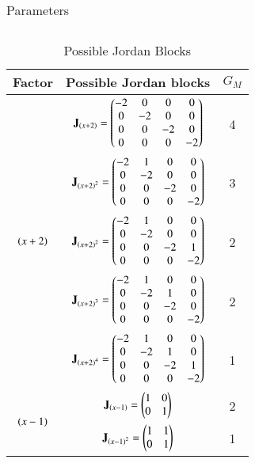 \documentclass[journal,12pt,twocolumn]{IEEEtran}
\numberwithin{table}{section}
\begin{document}
\begin{table*}[ht!]
\begin{center}
\begin{tabular}{|p{5cm}|p{11cm}|}
\\ [0.5ex] 
\hline
\end{tabular}
\caption{Parameters}
\label{table:2}
\end{center}
\vspace{-0.5cm}
\end{table*}

\renewcommand{\thetable}{3}
\begin{table*}[ht!]
\begin{center}
\begin{tabular}{|c|c|c|}
\hline
\textbf{Factor} & \textbf{Possible Jordan blocks} & $G_M$ \\[0.5ex]
\hline
\multirow{5}{*}{$\left(x+2\right)$} & 
$\mathbf{J}_{\left(x+2\right)}=\begin{pmatrix}-2&0&0&0\\0&-2&0&0\\0&0&-2&0\\0&0&0&-2\end{pmatrix}$ & 4\\ [0.5ex]  \cline{2-3}
& $\mathbf{J}_{\left(x+2\right)^2}=\begin{pmatrix}-2&1&0&0\\0&-2&0&0\\0&0&-2&0\\0&0&0&-2\end{pmatrix}$ & 3\\  [0.5ex] \cline{2-3}
& $\mathbf{J}_{\left(x+2\right)^2}=\begin{pmatrix}-2&1&0&0\\0&-2&0&0\\0&0&-2&1\\0&0&0&-2\end{pmatrix}$ & 2\\  [0.5ex] \cline{2-3}
& $\mathbf{J}_{\left(x+2\right)^3}=\begin{pmatrix}-2&1&0&0\\0&-2&1&0\\0&0&-2&0\\0&0&0&-2\end{pmatrix}$ & 2\\ [0.5ex]  \cline{2-3}
& $\mathbf{J}_{\left(x+2\right)^4}=\begin{pmatrix}-2&1&0&0\\0&-2&1&0\\0&0&-2&1\\0&0&0&-2\end{pmatrix}$ & 1
\\ [0.5ex] 
\hline
\multirow{2}{*}{$\left(x-1\right)$} & 
$\mathbf{J}_{\left(x-1\right)}=\begin{pmatrix}1&0\\0&1\end{pmatrix}$ &  2\\ [0.5ex]  \cline{2-3}
& $\mathbf{J}_{\left(x-1\right)^2}=\begin{pmatrix}1&1\\0&1\end{pmatrix}$ & 1
\\ [0.5ex] 
\hline
\end{tabular}
\caption{Possible Jordan Blocks}
\label{table:3}
\end{center}
\vspace{-0.5cm}
\end{table*}
\end{document}
